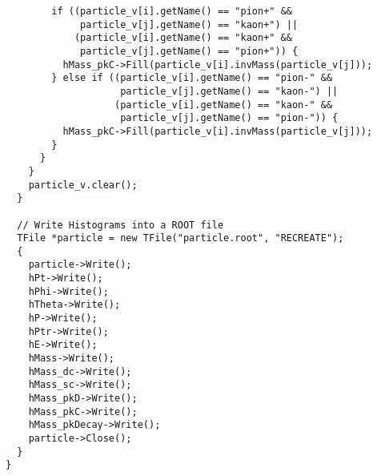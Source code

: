 \begin{lstlisting}
        if ((particle_v[i].getName() == "pion+" &&
             particle_v[j].getName() == "kaon+") ||
            (particle_v[i].getName() == "kaon+" &&
             particle_v[j].getName() == "pion+")) {
          hMass_pkC->Fill(particle_v[i].invMass(particle_v[j]));
        } else if ((particle_v[i].getName() == "pion-" &&
                    particle_v[j].getName() == "kaon-") ||
                   (particle_v[i].getName() == "kaon-" &&
                    particle_v[j].getName() == "pion-")) {
          hMass_pkC->Fill(particle_v[i].invMass(particle_v[j]));
        }
      }
    }
    particle_v.clear();
  }

  // Write Histograms into a ROOT file
  TFile *particle = new TFile("particle.root", "RECREATE");
  {
    particle->Write();
    hPt->Write();
    hPhi->Write();
    hTheta->Write();
    hP->Write();
    hPtr->Write();
    hE->Write();
    hMass->Write();
    hMass_dc->Write();
    hMass_sc->Write();
    hMass_pkD->Write();
    hMass_pkC->Write();
    hMass_pkDecay->Write();
    particle->Close();
  }
}
\end{lstlisting}